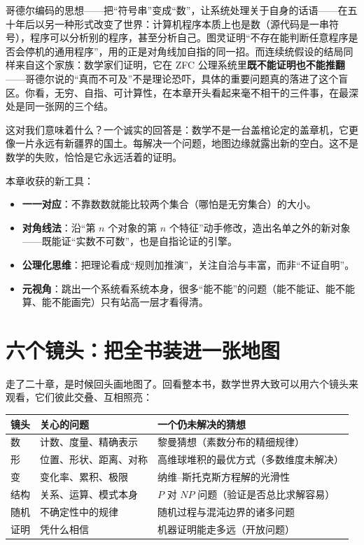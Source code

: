 \begin{lianjie}
哥德尔编码的思想——把“符号串”变成“数”，让系统处理关于自身的话语——在五十年后以另一种形式改变了世界：计算机程序本质上也是数（源代码是一串符号），程序可以分析别的程序，甚至分析自己。图灵证明“不存在能判断任意程序是否会停机的通用程序”，用的正是对角线加自指的同一招。而连续统假设的结局同样来自这个家族：数学家们证明，它在 ZFC 公理系统里\textbf{既不能证明也不能推翻}——哥德尔说的“真而不可及”不是理论恐吓，具体的重要问题真的落进了这个盲区。你看，无穷、自指、可计算性，在本章开头看起来毫不相干的三件事，在最深处是同一张网的三个结。
\end{lianjie}

这对我们意味着什么？一个诚实的回答是：数学不是一台盖棺论定的盖章机，它更像一片永远有新疆界的国土。每解决一个问题，地图边缘就露出新的空白。这不是数学的失败，恰恰是它永远活着的证明。

\begin{toolbox}
本章收获的新工具：
\begin{itemize}
\item \textbf{一一对应}：不靠数数就能比较两个集合（哪怕是无穷集合）的大小。
\item \textbf{对角线法}：沿“第 $n$ 个对象的第 $n$ 个特征”动手修改，造出名单之外的新对象——既能证“实数不可数”，也是自指论证的引擎。
\item \textbf{公理化思维}：把理论看成“规则加推演”，关注自洽与丰富，而非“不证自明”。
\item \textbf{元视角}：跳出一个系统看系统本身，很多“能不能”的问题（能不能证、能不能算、能不能画完）只有站高一层才看得清。
\end{itemize}
\end{toolbox}

\section{六个镜头：把全书装进一张地图}

走了二十章，是时候回头画地图了。回看整本书，数学世界大致可以用六个镜头来观看，它们彼此交叠、互相照亮：

\begin{center}
\begin{tabular}{lll}
\toprule
镜头 & 关心的问题 & 一个仍未解决的猜想 \\
\midrule
数 & 计数、度量、精确表示 & 黎曼猜想（素数分布的精细规律）\\
形 & 位置、形状、距离、对称 & 高维球堆积的最优方式（多数维度未解决）\\
变 & 变化率、累积、极限 & 纳维–斯托克斯方程解的光滑性\\
结构 & 关系、运算、模式本身 & $P$ 对 $NP$ 问题（验证是否总比求解容易）\\
随机 & 不确定性中的规律 & 随机过程与混沌边界的诸多问题\\
证明 & 凭什么相信 & 机器证明能走多远（开放问题）\\
\bottomrule
\end{tabular}
\end{center}

